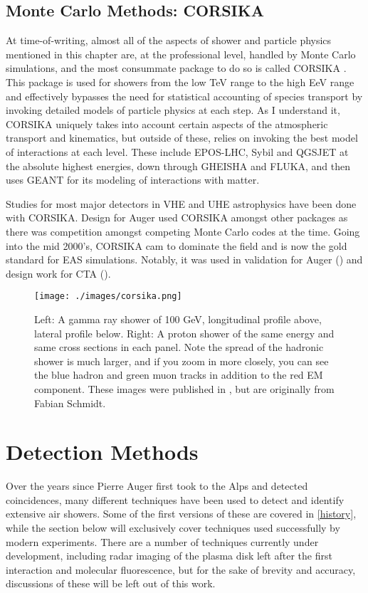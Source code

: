 \subsection{Monte Carlo Methods: CORSIKA}
\label{corsika}
At time-of-writing, almost all of the aspects of shower and particle physics mentioned in this chapter are, at the professional level, handled by Monte Carlo simulations, and the most consummate package to do so is called CORSIKA \cite{corsika}. This package is used for showers from the low TeV range to the high EeV range and effectively bypasses the need for statistical accounting of species transport by invoking detailed models of particle physics at each step. As I understand it, CORSIKA uniquely takes into account certain aspects of the atmospheric transport and kinematics, but outside of these, relies on invoking the best model of interactions at each level. These include EPOS-LHC, Sybil and QGSJET at the absolute highest energies, down through GHEISHA and FLUKA, and then uses GEANT for its modeling of interactions with matter.

Studies for most major detectors in VHE and UHE astrophysics have been done with CORSIKA. Design for Auger used CORSIKA amongst other packages as there was competition amongst competing Monte Carlo codes at the time. Going into the mid 2000's, CORSIKA cam to dominate the field and is now the gold standard for EAS simulations. Notably, it was used in validation for Auger (\textcite{corsikauger}) and design work for CTA (\textcite{ctasika}).
\begin{figure}[h!]
\begin{center}
\texttt{[image: ./images/corsika.png]}
\caption[CORSIKA: Gamma Rays Versus Hadrons]{Left: A gamma ray shower of 100 GeV, longitudinal profile above, lateral profile below. Right: A proton shower of the same energy and same cross sections in each panel. Note the spread of the hadronic shower is much larger, and if you zoom in more closely, you can see the blue hadron and green muon tracks in addition to the red EM component. These images were published in \textcite{steinke}, but are originally from Fabian Schmidt.}
\label{corsikadiag}
\end{center}
\end{figure}


\newpage
\section{Detection Methods}
\label{detectors}
Over the years since Pierre Auger first took to the Alps and detected coincidences, many different techniques have been used to detect and identify extensive air showers. Some of the first versions of these are covered in \autoref{history}, while the section below will exclusively cover techniques used successfully by modern experiments. There are a number of techniques currently under development, including radar imaging of the plasma disk left after the first interaction and molecular fluorescence, but for the sake of brevity and accuracy, discussions of these will be left out of this work.
